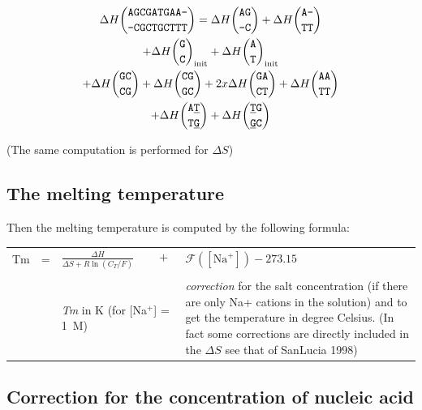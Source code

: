 \documentclass{article}
\begin{document}
\begin{multline*}
\Delta H {\mbox{\texttt{AGCGATGAA-}} \choose \mbox{\texttt{-CGCTGCTTT}}} = 
\Delta H {\mbox{\texttt{AG}} \choose \mbox{\texttt{-C}} } + 
\Delta H {\mbox{\texttt{A-}} \choose \mbox{\texttt{TT}} } \\ +
\Delta H {\mbox{\texttt{G}} \choose \mbox{\texttt{C}} }_\mathrm{init} +
\Delta H {\mbox{\texttt{A}} \choose \mbox{\texttt{T}} }_\mathrm{init} \\ +
\Delta H {\mbox{\texttt{GC}} \choose \mbox{\texttt{CG}} } +
\Delta H {\mbox{\texttt{CG}} \choose \mbox{\texttt{GC}} } +
2x \Delta H {\mbox{\texttt{GA}} \choose \mbox{\texttt{CT}} } +
\Delta H {\mbox{\texttt{AA}} \choose \mbox{\texttt{TT}} } \\ +
\Delta H {\mbox{\texttt{A\underline{T}}} \choose \mbox{\texttt{T\underline{G}}} } +
\Delta H {\mbox{\texttt{\underline{T}G}} \choose \mbox{\texttt{\underline{G}C}} }
\end{multline*}

       (The same computation is performed for $\Delta S$)


\subsection{The melting temperature }  
Then the melting temperature is computed by the following formula:   

\begin{tabular}{rcp{1.6in}p{2.2in}}
Tm & = & \begin{math} \frac{\Delta{}H}{\Delta{}S + R \ln (C_T/F)} \hspace{2em} + \end{math} & \begin{math}\mathcal{F}([\mathrm{Na}^+]) - 273.15 \end{math} \\
   &   &                                                                                          &                                                       \\
   &   & \footnotesize \textit{Tm} in K (for [Na$^+$] = 1~M)    &\footnotesize \emph{correction} for the 
salt concentration (if there are only Na+ cations in the solution) and to get the temperature in degree Celsius. (In fact 
some corrections are directly included in the $\Delta S$ see that of SanLucia 
1998)    
\end{tabular}
   
\subsection{Correction for the concentration of nucleic acid }  
\end{document}
